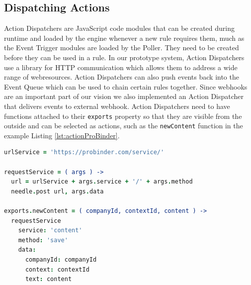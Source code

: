 \subsection{Dispatching Actions}
\textrm{Action Dispatchers} are \textrm{JavaScript} code modules that can be created during runtime and loaded by the engine whenever a new rule requires them, much as the \textrm{Event Trigger} modules are loaded by the \textrm{Poller}.
They need to be created before they can be used in a rule.
In our prototype system, \textrm{Action Dispatchers} use a library for \textrm{HTTP} communication which allows them to address a wide range of \textrm{\glspl{webresource}}.
\textrm{Action Dispatchers} can also push events back into the \textrm{Event Queue} which can be used to chain certain rules together.
Since \textrm{\glspl{webhook}} are an important part of our vision we also implemented an \textrm{Action Dispatcher} that delivers events to external \textrm{\gls{webhook}}.
\textrm{Action Dispatchers} need to have functions attached to their \texttt{exports} property so that they are visible from the outside and can be selected as actions, such as the \texttt{newContent} function in the example Listing \ref{lst:actionProBinder}.
\begin{lstlisting}[float=h,label=lst:actionProBinder,language=CoffeeScript,caption=Action Dispatcher code to store a new content on the ProBinder RESTful Web service; written in CoffeeScript]
urlService = 'https://probinder.com/service/'

requestService = ( args ) ->
  url = urlService + args.service + '/' + args.method
  needle.post url, args.data

exports.newContent = ( companyId, contextId, content ) ->
  requestService
    service: 'content'
    method: 'save'
    data:
      companyId: companyId
      context: contextId
      text: content
\end{lstlisting}





